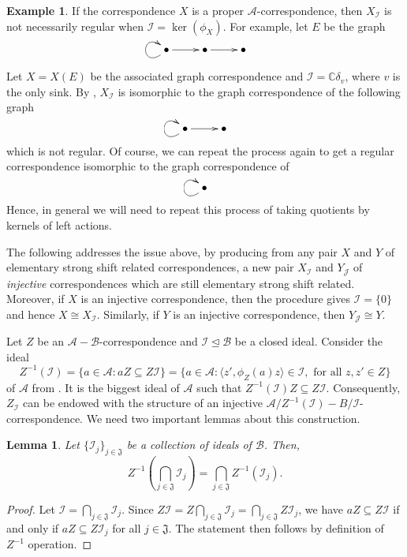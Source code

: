 \documentclass[11pt, letterpaper,final]{amsart}
\newcommand{\A}{{\mathcal{A}}}
\newcommand{\B}{{\mathcal{B}}}
\newcommand{\I}{{\mathcal{I}}}
\newcommand{\J}{{\mathcal{J}}}
\newcommand{\bbC}{{\mathbb{C}}}
\newtheorem{lem}[thm]{Lemma}
\theoremstyle{definition}
\newtheorem{exm}[thm]{Example}
\begin{document}
\begin{exm}
If the correspondence $X$ is a proper $\A$-correspondence, then $X_{\I}$ is not necessarily regular when $\I = \ker(\phi_X)$. For example, let $E$ be the graph 
$$
\xymatrix{
\bullet \ar@(dl, ul)[] \ar[r] & \bullet \ar[r] &\bullet
}
$$

\bigskip
Let $X = X(E)$ be the associated graph correspondence and $\I = \bbC \delta_v$, where $v$ is the only sink.  By \cite[Example~2.4]{FMR-IUMJ2003}, $X_{\I}$ is isomorphic to the graph correspondence of the following graph 
$$
\xymatrix{
\bullet \ar@(dl, ul)[] \ar[r] & \bullet 
}
$$
\bigskip
which is not regular.  Of course, we can repeat the process again to get a regular correspondence isomorphic to the graph correspondence of 
$$
\xymatrix{
\bullet \ar@(dl, ul)[]  
}
$$
Hence, in general we will need to repeat this process of taking quotients by kernels of left actions.
\end{exm}

The following addresses the issue above, by producing from any pair $X$ and $Y$ of elementary strong shift related correspondences, a new pair $X_{\I}$ and $Y_{\J}$ of \emph{injective} correspondences which are still elementary strong shift related.  Moreover, if $X$ is an injective correspondence, then the procedure gives $\I = \{0 \}$ and hence $X \cong X_\I$.  Similarly, if $Y$ is an injective correspondence, then $Y_{\J} \cong Y$.

Let $Z$ be an $\A-\B$-correspondence and $\I\unlhd \B$ be a closed ideal.
Consider the ideal
\[
Z^{-1}(\I) = \{a\in \A\colon aZ\subseteq Z\I\} = \{ a \in \A \colon \langle z', \phi_Z(a) z \rangle \in \I , \text{ for all } z, z' \in Z \}
\]
of $\A$ from \cite[Definition 4.1]{KatII}.
It is the biggest ideal of $\A$ such that $Z^{-1}(\I)Z\subseteq Z\I$.
Consequently, $Z_{\I}$ can be endowed with the structure of an injective $\A/Z^{-1}({\I})-B/\I$-correspondence.
We need two important lemmas about this construction.
\begin{lem}\label{l:inv-intersection}
  Let $\{\I_j\}_{j\in \mathfrak J}$ be a collection of ideals of $\B$.
  Then,
  \[
    Z^{-1}(\bigcap_{j\in\mathfrak{J}} \I_j) = \bigcap_{j\in \mathfrak{J}} Z^{-1}(\I_j).
  \]
\end{lem}
\begin{proof}
  Let $\I = \bigcap_{j\in \mathfrak{J}} \I_j$.
  Since $Z\I = Z\bigcap_{j\in \mathfrak{J}} \I_j = \bigcap_{j\in \mathfrak{J}}Z \I_j$, we have $aZ\subseteq Z\I$ if and only if $aZ\subseteq Z\I_j$ for all $j\in \mathfrak{J}$.
  The statement then follows by definition of $Z^{-1}$ operation.
\end{proof}
\end{document}
